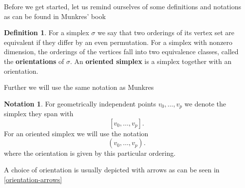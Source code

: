 \documentclass[draft,toc=bib]{scrartcl}
\theoremstyle{plain}
\theoremstyle{definition}
\newtheorem	{definition}[theorem]{Definition}
\newtheorem{notation}[theorem]{Notation}
\theoremstyle{remark}
\begin{document}
Before we get started, let us remind ourselves of some definitions and notations as can be found in Munkres' book \cite[p. 26f.]{mu}
\begin{definition}
	For a simplex $\sigma$ we say that two orderings of its vertex set are equivalent if they differ by an even permutation. For a simplex with nonzero dimension, the orderings of the vertices fall into two equivalence classes, called the \textbf{orientations} of $\sigma$. An \textbf{oriented simplex} is a simplex together with an orientation.
\end{definition}
Further we will use the same notation as Munkres \cite[p. 26]{mu}
\begin{notation}
	For geometrically independent points $v_0,\dots,v_p$ we denote the simplex they span with
	\[
	[v_0,\dots,v_p].
	\]
	For an oriented simplex we will use the notation
	\[
	(v_0,\dots,v_p).
	\]
	where the orientation is given by this particular ordering.
\end{notation}

A choice of orientation is usually depicted with arrows as can be seen in \autoref{orientation-arrows}
\end{document}
